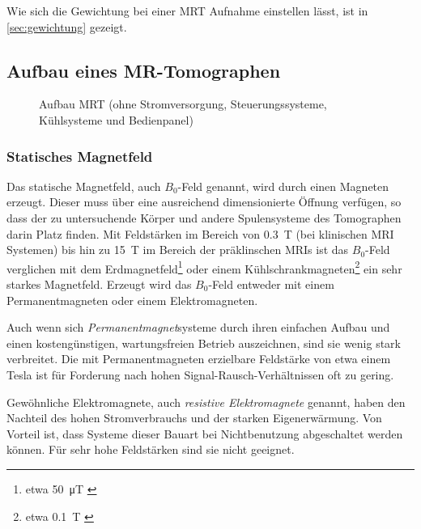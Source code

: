 Wie sich die Gewichtung bei einer MRT Aufnahme einstellen lässt, ist in \autoref{sec:gewichtung} gezeigt.

\subsection{Aufbau eines MR-Tomographen}

\begin{figure}[H]
	\centering
	\caption[Aufbau MR-Tomographen]{Aufbau MRT (ohne Stromversorgung, Steuerungssysteme, Kühlsysteme und Bedienpanel)}
	\label{fig:biospecAnot}
\end{figure}

\subsubsection{Statisches Magnetfeld}
Das statische Magnetfeld, auch $B_0$-Feld genannt, wird durch einen Magneten erzeugt. Dieser muss über eine ausreichend dimensionierte Öffnung verfügen, so dass der zu untersuchende Körper und andere Spulensysteme des Tomographen darin Platz finden. Mit Feldstärken im Bereich von \SI{0.3}{\tesla} (bei klinischen MRI Systemen) bis hin zu \SI{15}{\tesla} im Bereich der präklinschen MRIs ist das $B_0$-Feld verglichen mit dem Erdmagnetfeld\footnote{etwa \SI{50}{\micro\tesla} \cite{Enc1994}} oder einem Kühlschrankmagneten\footnote{etwa \SI{0.1}{\tesla} \cite{LHC2018}} ein sehr starkes Magnetfeld.
Erzeugt wird das $B_0$-Feld entweder mit einem Permanentmagneten oder einem Elektromagneten. 

Auch wenn sich \textit{Permanentmagnet}systeme durch ihren einfachen Aufbau und einen kostengünstigen, wartungsfreien Betrieb auszeichnen, sind sie wenig stark verbreitet. Die mit Permanentmagneten erzielbare Feldstärke von etwa einem Tesla ist für Forderung nach hohen Signal-Rausch-Verhältnissen oft zu gering.

Gewöhnliche Elektromagnete, auch \textit{resistive Elektromagnete} genannt, haben den Nachteil des hohen Stromverbrauchs und der starken Eigenerwärmung. Von Vorteil ist, dass Systeme dieser Bauart bei Nichtbenutzung abgeschaltet werden können. Für sehr hohe Feldstärken sind sie nicht geeignet.

